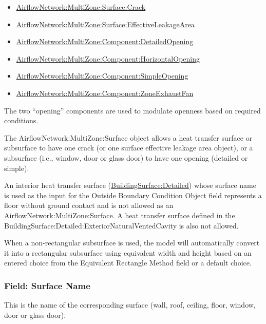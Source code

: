 \begin{itemize}
\item
  \hyperref[airflownetworkmultizonesurfacecrack]{AirflowNetwork:MultiZone:Surface:Crack}
\item
  \hyperref[airflownetworkmultizonesurfaceeffectiveleakagearea]{AirflowNetwork:MultiZone:Surface:EffectiveLeakageArea}
\item
  \hyperref[airflownetworkmultizonecomponentdetailedopening]{AirflowNetwork:MultiZone:Component:DetailedOpening}
\item
  \hyperref[airflownetworkmultizonecomponenthorizontalopening]{AirflowNetwork:MultiZone:Component:HorizontalOpening}
\item
  \hyperref[airflownetworkmultizonecomponentsimpleopening]{AirflowNetwork:MultiZone:Component:SimpleOpening}
\item
  \hyperref[airflownetworkmultizonecomponentzoneexhaustfan]{AirflowNetwork:MultiZone:Component:ZoneExhaustFan}
\end{itemize}

The two ``opening'' components are used to modulate openness based on required conditions.

The AirflowNetwork:MultiZone:Surface object allows a heat transfer surface or subsurface to have one crack (or one surface effective leakage area object), or a subsurface (i.e., window, door or glass door) to have one opening (detailed or simple).

An interior heat transfer surface (\hyperref[buildingsurfacedetailed]{BuildingSurface:Detailed}) whose surface name is used as the input for the Outside Boundary Condition Object field represents a floor without ground contact and is not allowed as an AirflowNetwork:MultiZone:Surface. A heat transfer surface defined in the BuildingSurface:Detailed:ExteriorNaturalVentedCavity is also not allowed.

When a non-rectangular subsurface is used, the model will automatically convert it into a rectangular subsurface using equivalent width and height based on an entered choice from the Equivalent Rectangle Method field or a default choice.

\subsubsection{Field: Surface Name}\label{field-surface-name-000}

This is the name of the corresponding surface (wall, roof, ceiling, floor, window, door or glass door).

